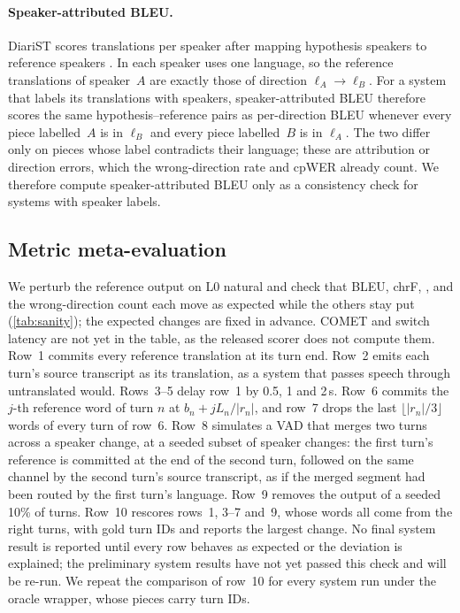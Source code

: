 \paragraph{Speaker-attributed BLEU.}
DiariST scores translations per speaker after mapping hypothesis speakers to reference speakers \citep{yang2024diarist}. In \task each speaker uses one language, so the reference translations of speaker~$A$ are exactly those of direction $\ell_A\to\ell_B$. For a system that labels its translations with speakers, speaker-attributed BLEU therefore scores the same hypothesis--reference pairs as per-direction BLEU whenever every piece labelled~$A$ is in $\ell_B$ and every piece labelled~$B$ is in $\ell_A$. The two differ only on pieces whose label contradicts their language; these are attribution or direction errors, which the wrong-direction rate and cpWER already count. We therefore compute speaker-attributed BLEU only as a consistency check for systems with speaker labels.

\subsection{Metric meta-evaluation}



We perturb the reference output on \taxi L0 natural and check that BLEU, chrF, \laal, \eo and the wrong-direction count each move as expected while the others stay put (\cref{tab:sanity}); the expected changes are fixed in advance. COMET and switch latency are not yet in the table, as the released scorer does not compute them. Row~1 commits every reference translation at its turn end. Row~2 emits each turn's source transcript as its translation, as a system that passes speech through untranslated would. Rows~3--5 delay row~1 by 0.5, 1 and 2\,s. Row~6 commits the $j$-th reference word of turn $n$ at $b_n+jL_n/|r_n|$, and row~7 drops the last $\lfloor|r_n|/3\rfloor$ words of every turn of row~6. Row~8 simulates a VAD that merges two turns across a speaker change, at a seeded subset of speaker changes: the first turn's reference is committed at the end of the second turn, followed on the same channel by the second turn's source transcript, as if the merged segment had been routed by the first turn's language. Row~9 removes the output of a seeded 10\% of turns. Row~10 rescores rows~1, 3--7 and~9, whose words all come from the right turns, with gold turn IDs and reports the largest change. No final system result is reported until every row behaves as expected or the deviation is explained; the preliminary system results have not yet passed this check and will be re-run. We repeat the comparison of row~10 for every system run under the oracle wrapper, whose pieces carry turn IDs.

